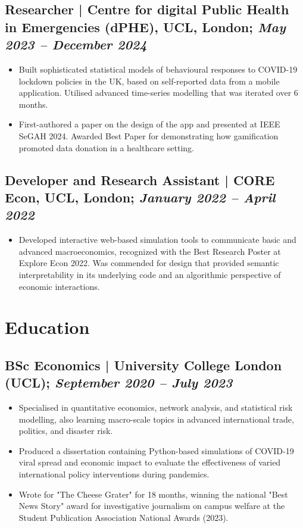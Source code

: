 \documentclass[a4paper,10pt]{article}
\begin{document}
\subsection*{Researcher | Centre for digital Public Health in Emergencies (dPHE), UCL, London; \textit{May 2023 – December 2024}}
\begin{itemize}
    \item Built sophisticated statistical models of behavioural responses to COVID-19 lockdown policies in the UK, based on self-reported data from a mobile application. Utilised advanced time-series modelling that was iterated over 6 months.
    \item First-authored a paper on the design of the app and presented at IEEE SeGAH 2024. Awarded Best Paper for demonstrating how gamification promoted data donation in a healthcare setting.
\end{itemize}

\subsection*{Developer and Research Assistant | CORE Econ, UCL, London; \textit{January 2022 – April 2022}}
\begin{itemize}
    \item Developed interactive web-based simulation tools to communicate basic and advanced macroeconomics, recognized with the Best Research Poster at Explore Econ 2022. Was commended for design that provided semantic interpretability in its underlying code and an algorithmic perspective of economic interactions.
\end{itemize}

\section*{Education}

\subsection*{BSc Economics | University College London (UCL); \textit{September 2020 – July 2023}}
\begin{itemize}
    \item Specialised in quantitative economics, network analysis, and statistical risk modelling, also learning macro-scale topics in advanced international trade, politics, and disaster risk.
    \item Produced a dissertation containing Python-based simulations of COVID-19 viral spread and economic impact to evaluate the effectiveness of varied international policy interventions during pandemics.
    \item Wrote for "The Cheese Grater" for 18 months, winning the national "Best News Story" award for investigative journalism on campus welfare at the Student Publication Association National Awards (2023). 
\end{itemize}
\end{document}

